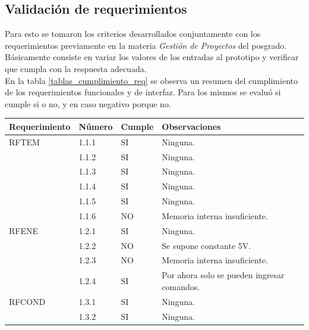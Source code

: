 \subsection{ Validación de requerimientos }

Para esto se tomaron los criterios desarrollados conjuntamente con los requerimientos previamente en la materia \emph{Gestión de Proyectos} del posgrado. Básicamente consiste en variar los valores de los entradas al prototipo y verificar que cumpla con la respuesta adecuada.\\
En la tabla \ref{tablas_cumplimiento_req} se observa un resumen del cumplimiento de los requerimientos funcionales y de interfaz. Para los mismos se evaluó si cumple si o no, y en caso negativo porque no.
\begin{table}[h!]
\begin{flushleft}
\begin{tabular}{|m{2.6cm}|m{1.5cm}|m{1.5cm}|m{6.8cm}|}\hline
{\textbf{Requerimiento}} & {\textbf{Número}} & {\textbf{Cumple}} & {\textbf{Observaciones}}\\ \hline
\multicolumn{1}{|l|}{RFTEM} & { 1.1.1 } & { SI } & { Ninguna. }\\ \cline{ 2- 4}
\multicolumn{1}{|l|}{} & { 1.1.2 } & { SI } & { Ninguna. } \\ \cline{ 2- 4}
\multicolumn{1}{|l|}{} & { 1.1.3 } & { SI } & { Ninguna. } \\ \cline{ 2- 4}
\multicolumn{1}{|l|}{} & { 1.1.4 } & { SI } & { Ninguna. } \\ \cline{ 2- 4}
\multicolumn{1}{|l|}{} & { 1.1.5 } & { SI } & { Ninguna. } \\ \cline{ 2- 4}
\multicolumn{1}{|l|}{} & { 1.1.6 } & { NO } & { Memoria interna insuficiente. } \\ \hline
\multicolumn{1}{|l|}{RFENE} & { 1.2.1 } & { SI } & { Ninguna. }\\ \cline{ 2- 4} 
\multicolumn{1}{|l|}{} & { 1.2.2 } & { NO } & { Se supone constante 5V. } \\ \cline{ 2- 4}
\multicolumn{1}{|l|}{} & { 1.2.3 } & { NO } & { Memoria interna insuficiente. } \\ \cline{ 2- 4}
\multicolumn{1}{|l|}{} & { 1.2.4 } & { SI } & { Por ahora solo se pueden ingresar comandos. } \\ \hline
\multicolumn{1}{|l|}{RFCOND} & { 1.3.1 } & { SI } & { Ninguna. }\\ \cline{ 2- 4} 
\multicolumn{1}{|l|}{} & { 1.3.2 } & { SI } & { Ninguna. }\\ \hline

\end{tabular}
\end{flushleft}
\end{table}
